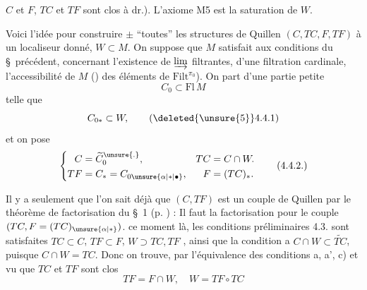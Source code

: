 $C$ et $F$, $TC$ et $TF$ sont clos    à dr.). L'axiome M5 est la saturation  de $W$.

  Voici l'idée pour construire $\pm$ ``toutes'' les  structures de Quillen  $(C,TC,F,TF)$  à un localiseur donné, $W\subset M$. On suppose que $M$ satisfait aux conditions du \S\ précédent, concernant l'existence de $\varinjlim$ filtrantes, d'une filtration cardinale, l'accessibilité de $M$ ()  des éléments de $\mathrm{Filt}^{\pi_0}$). On part d'une partie petite
\[
C_0\subset\mathrm{Fl}\,M
\]
telle que
\[
C_{0*}\subset W,
\tag*{(\deleted{\unsure{5}}4.4.1)}
\]
et on pose
\[
\left\{\begin{aligned}
C&=\widetilde C_0^{\unsure{.}},& TC&=C\cap W.\\
TF&=C_*=C_{0\unsure{\alpha|*|\bullet}},& F&=(TC)_*.
\end{aligned}\right.
\tag*{(4.4.2.)}
\]

Il y a    seulement   que l'on sait déjà que $(C,TF)$ est un couple de Quillen par le théorème de factorisation du \S\ 1 (p. ) : Il faut la factorisation pour le couple $(TC,F=(TC)_{\unsure{\alpha|*}})$.  ce moment là, les conditions préliminaires  4.3. sont satisfaites $TC\subset C$, $TF\subset F$, $W\supset TC,TF$ , ainsi que la condition a $C\cap W\subset\widetilde{TC}$, puisque $C\cap W=TC$. Donc on trouve, par l'équivalence des conditions a, a', c) et vu que $TC$ et $TF$ sont clos
\[
TF=F\cap W,\quad W=TF\circ TC
\]
